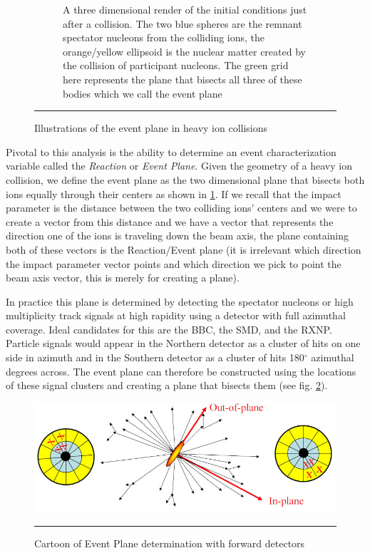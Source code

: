 \begin{figure}[htbp!]
\begin{subfigure}[p]{0.7\textwidth}
	\caption[Central vs Peripheral collisions, geometry of initial conditions]{A three dimensional render of the initial conditions just after a collision. The two blue spheres are the remnant spectator nucleons from the colliding ions, the orange/yellow ellipsoid is the nuclear matter created by the collision of participant nucleons. The green grid here represents the plane that bisects all three of these bodies which we call the event plane}
    \end{subfigure}
    \rule{35em}{0.5pt}
  \caption[Illustrations of the event plane in heavy ion collisions]{Illustrations of the event plane in heavy ion collisions}
  \label{fig:evtpln}
\end{figure}

Pivotal to this analysis is the ability to determine an event characterization variable called the \textit{Reaction} or \textit{Event Plane}. Given the geometry of a heavy ion collision, we define the event plane as the two dimensional plane that bisects both ions equally through their centers as shown in \ref{fig:evtpln}. If we recall that the impact parameter is the distance between the two colliding ions' centers and we were to create a vector from this distance and we have a vector that represents the direction one of the ions is traveling down the beam axis, the plane containing both of these vectors is the Reaction/Event plane (it is irrelevant which direction the impact parameter vector points and which direction we pick to point the beam axis vector, this is merely for creating a plane).

In practice this plane is determined by detecting the spectator nucleons or high multiplicity track signals at high rapidity using a detector with full azimuthal coverage. Ideal candidates for this are the BBC, the SMD, and the RXNP. Particle signals would appear in the Northern detector as a cluster of hits on one side in azimuth and in the Southern detector as a cluster of hits 180$^\circ$ azimuthal degrees across. The event plane can therefore be constructed using the locations of these signal clusters and creating a plane that bisects them (see fig. \ref{fig:rxnpexpcartoon}).

\begin{figure}[htbp!]
  \centering
    \includegraphics[width=1\textwidth]{Figures/reactionplaneexpcartoon.jpg}
    \rule{35em}{0.5pt}
  \caption[Cartoon of Event Plane determination with forward detectors]{Cartoon of Event Plane determination with forward detectors \citep{RXNPfocus}}
  \label{fig:rxnpexpcartoon}
\end{figure}

